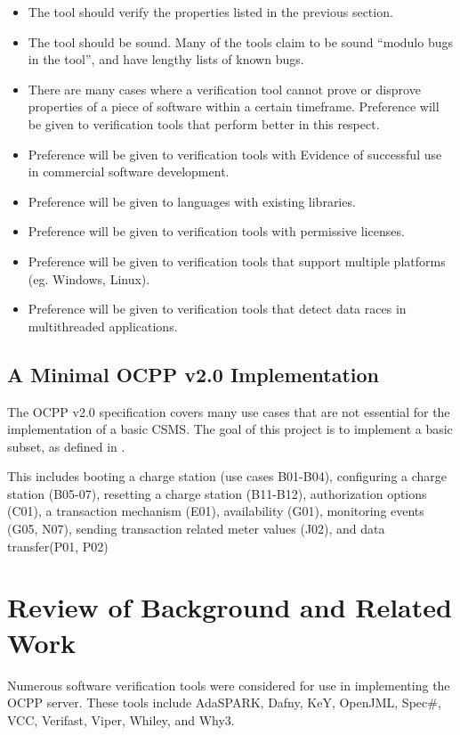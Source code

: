 \documentclass[11pt]{article}
\begin{document}
\begin{itemize}
	\item The tool should verify the properties listed in the previous section.
	\item The tool should be sound. Many of the tools claim to be sound ``modulo bugs in the tool'', and have lengthy lists of known bugs.
	\item There are many cases where a verification tool cannot prove or disprove properties of a piece of software within a certain timeframe. Preference will be given to verification tools that perform better in this respect.
	\item Preference will be given to verification tools with Evidence of successful use in commercial software development.
	\item Preference will be given to languages with existing libraries.
	\item Preference will be given to verification tools with permissive licenses.
	\item Preference will be given to verification tools that support multiple platforms (eg. Windows, Linux).
	\item Preference will be given to verification tools that detect data races in multithreaded applications.
\end{itemize}





\subsection{A Minimal OCPP v2.0 Implementation}
The OCPP v2.0 specification covers many use cases that are not essential for the implementation of a basic CSMS. The goal of this project is to implement a basic subset, as defined in \cite[p.10]{ocpp}.

This includes booting a charge station (use cases B01-B04), configuring a charge station (B05-07), resetting a charge station (B11-B12), authorization options (C01), a transaction mechanism (E01), availability (G01), monitoring events (G05, N07), sending transaction related meter values (J02), and data transfer(P01, P02)
 
\section{Review of Background and Related Work}
Numerous software verification tools were considered for use in implementing the OCPP server. These tools include AdaSPARK, Dafny, KeY, OpenJML, Spec\#, VCC, Verifast, Viper, Whiley, and Why3.
\end{document}
